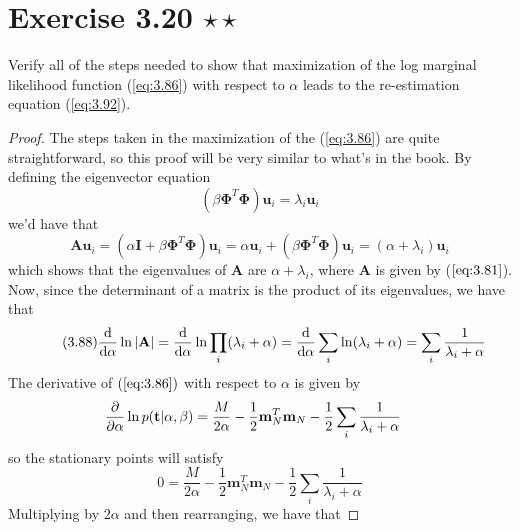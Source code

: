 \section*{Exercise 3.20 $\star \star$}
Verify all of the steps needed to show that 
maximization of the log marginal likelihood function (\ref{eq:3.86}) with
respect to $\alpha$ leads to the re-estimation equation (\ref{eq:3.92}).

\vspace{1em}
        
\begin{proof}
    The steps taken in the maximization of the (\ref{eq:3.86})
    are quite straightforward, so this proof will be very similar 
    to what's in the book. By defining the eigenvector equation
    \begin{equation}\label{eq:3.87}\tag{3.87}
        (\beta \mathbf{\Phi}^T\mathbf{\Phi})\mathbf{u}_i = \lambda_i \mathbf{u}_i
    \end{equation}
    we'd have that
    \[
        \mathbf{A}\mathbf{u}_i 
        = (\alpha\mathbf{I} + \beta\mathbf{\Phi}^T\mathbf{\Phi})\mathbf{u}_i
        = \alpha\mathbf{u}_i + (\beta \mathbf{\Phi}^T\mathbf{\Phi})\mathbf{u}_i
        = (\alpha + \lambda_i) \mathbf{u}_i
    \] 
    which shows that the eigenvalues of $\mathbf{A}$ are $\alpha + \lambda_i$,
    where $\mathbf{A}$ is given by ($\ref{eq:3.81}$).
    Now, since the determinant of a matrix is the product of its eigenvalues, 
    we have that
    \begin{equation}\label{eq:3.88}\tag{3.88}
        \dv{\alpha} \ln|\mathbf{A}| 
        = \dv{\alpha} \ln \prod_{i}(\lambda_i + \alpha)
        = \dv{\alpha} \sum_i \ln(\lambda_i + \alpha)
        = \sum_i \frac{1}{\lambda_i + \alpha}
    \end{equation}
    The derivative of $(\ref{eq:3.86})$ with respect to $\alpha$ is given by
    \begin{align*}
        \pdv{\alpha} \ln p(\mathbf{t} | \alpha, \beta)
        &= \frac{M}{2\alpha} - \frac{1}{2} \mathbf{m}_N^T\mathbf{m}_N 
        - \frac{1}{2} \sum_i\frac{1}{\lambda_i + \alpha}
    \end{align*}
    so the stationary points will satisfy
    \begin{equation}\label{eq:3.89}\tag{3.89}
        0 = \frac{M}{2\alpha} - \frac{1}{2} \mathbf{m}_N^T\mathbf{m}_N 
        - \frac{1}{2} \sum_{i} \frac{1}{\lambda_i + \alpha}
    \end{equation}
    Multiplying by $2\alpha$ and then rearranging,
    we have that

\end{proof}
